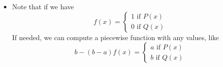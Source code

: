 \begin{itemize}
	\item Note that if we have
	\[
  			f(x)=\begin{cases}
               1 \text{ if } P(x) \\
               0 \text{ if } Q(x)
            \end{cases}
		\]
		If needed, we can compute a piecewise function with any values, like 
		\[
  			b - (b - a)f(x)=\begin{cases}
               a \text{ if } P(x) \\
               b \text{ if } Q(x)
            \end{cases}
		\]
		
\end{itemize}
\label{sec:iteration}